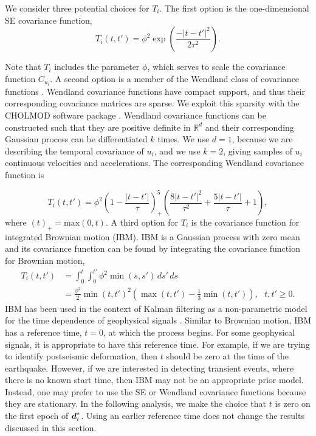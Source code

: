 \documentclass[extra,mreferee]{gji}
\begin{document}

We consider three potential choices for $T_i$. The first option is the
one-dimensional SE covariance function,
\begin{equation}\label{eq:TimeSE}
T_i(t,t') = \phi^2\exp\left(\frac{-|t - t'|^2}{2\tau^2}\right).
\end{equation}

Note that $T_i$ includes the parameter $\phi$, which serves to scale
the covariance function $C_{u_i}$. A second option is a member of
the Wendland class of covariance functions \citep{Wendland2005}.
Wendland covariance functions have compact support, and thus their
corresponding covariance matrices are sparse. We exploit this sparsity
with the CHOLMOD software package \citep{Chen2008}. Wendland
covariance functions can be constructed such that they are positive
definite in $\mathbb{R}^d$ and their corresponding Gaussian process
can be differentiated $k$ times. We use $d=1$, because we are
describing the temporal covariance of $u_i$, and we use $k=2$, giving
samples of $u_i$ continuous velocities and accelerations. The
corresponding Wendland covariance function is

\begin{equation}\label{eq:Wendland} 
T_i(t,t') = \phi^2\left(1 - \frac{|t - t'|}{\tau}\right)^5_+ 
            \left(\frac{8|t - t'|^2}{\tau^2} + \frac{5|t - t'|}{\tau} + 1\right), 
\end{equation} 
where $(t)_+ = \mathrm{max}(0,t)$. A third option for $T_i$ is the
covariance function for integrated Brownian motion (IBM). IBM is a
Gaussian process with zero mean and its covariance function can be
found by integrating the covariance function for Brownian motion,
\begin{align}\label{eq:IBM}
T_i(t,t') &= \int_0^t \int_0^{t'} \phi^2 \min(s,s') \,ds'\,ds \nonumber \\
          &= \frac{\phi^2}{2}\min(t,t')^2 \left(\max(t,t') - \frac{1}{3}\min(t,t')\right), \ \ \ t,t' \geq 0.
\end{align}
IBM has been used in the context of Kalman filtering as a
non-parametric model for the time dependence of geophysical signals
\citep[e.g.,][]{Segall1997, McGuire2003, Ohtani2010, Hines2016a}.
Similar to Brownian motion, IBM has a reference time, $t=0$, at which
the process begins. For some geophysical signals, it is appropriate to
have this reference time. For example, if we are trying to identify
postseismic deformation, then $t$ should be zero at the time of the
earthquake.  However, if we are interested in detecting transient
events, where there is no known start time, then IBM may not be an
appropriate prior model. Instead, one may prefer to use the SE or
Wendland covariance functions because they are stationary. In the
following analysis, we make the choice that $t$ is zero on the first
epoch of $\data_i^*$. Using an earlier reference time does not change
the results discussed in this section.
\end{document}
